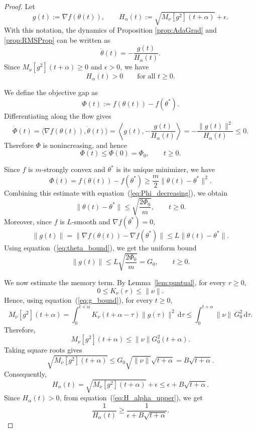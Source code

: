 \documentclass{article} %
\begin{document}
\begin{proof}
Let
\[
g(t):=\nabla f(\theta(t)),
\qquad
H_\alpha(t)
:=
\sqrt{M_\nu[g^2](t+\alpha)}+\epsilon.
\]
With this notation, the dynamics of Proposition \ref{prop:AdaGrad} and \ref{prop:RMSProp} can be written as
\[
\dot\theta(t)
=
-
\frac{g(t)}{H_\alpha(t)}.
\]
Since \(M_\nu[g^2](t+\alpha)\ge 0\) and \(\epsilon>0\), we have
\[
H_\alpha(t)>0
\qquad \text{for all } t\ge 0.
\]

We define the objective gap as
\[
\Phi(t)
:=
f(\theta(t))-f(\theta^*).
\]
Differentiating along the flow gives
\[
\dot\Phi(t)
=
\langle \nabla f(\theta(t)),\dot\theta(t)\rangle
=
\left\langle g(t),-\frac{g(t)}{H_\alpha(t)}\right\rangle
=
-
\frac{\|g(t)\|^2}{H_\alpha(t)}
\le 0.
\]
Therefore \(\Phi\) is nonincreasing, and hence
\begin{equation}
\label{eq:Phi_decreasing}
\Phi(t)\le \Phi(0)=\Phi_0,
\qquad t\ge 0.
\end{equation}

Since \(f\) is \(m\)-strongly convex and \(\theta^*\) is its unique minimizer, we have
\[
\Phi(t)
=
f(\theta(t))-f(\theta^*)
\ge
\frac m2\|\theta(t)-\theta^*\|^2.
\]
Combining this estimate with equation~(\ref{eq:Phi_decreasing}), we obtain
\begin{equation}
\label{eq:theta_bound}
\|\theta(t)-\theta^*\|
\le
\sqrt{\frac{2\Phi_0}{m}},
\qquad t\ge 0.
\end{equation}
Moreover, since \(f\) is \(L\)-smooth and \(\nabla f(\theta^*)=0\),
\[
\|g(t)\|
=
\|\nabla f(\theta(t))-\nabla f(\theta^*)\|
\le
L\|\theta(t)-\theta^*\|.
\]
Using equation~(\ref{eq:theta_bound}), we get the uniform bound
\begin{equation}
\label{eq:g_bound}
\|g(t)\|
\le
L\sqrt{\frac{2\Phi_0}{m}}
=
G_0,
\qquad t\ge 0.
\end{equation}

We now estimate the memory term. By Lemma~\ref{lem:puntual}, for every \(r\ge 0\),
\[
0\le K_\nu(r)\le \|\nu\|.
\]
Hence, using equation~(\ref{eq:g_bound}), for every \(t\ge 0\),
\[
M_\nu[g^2](t+\alpha)
=
\int_0^{t+\alpha}
K_\nu(t+\alpha-\tau)\|g(\tau)\|^2\,\mathrm d\tau
\le
\int_0^{t+\alpha}
\|\nu\|\,G_0^2\,\mathrm d\tau.
\]
Therefore,
\begin{equation}
\label{eq:memory_bound}
M_\nu[g^2](t+\alpha)
\le
\|\nu\|G_0^2(t+\alpha).
\end{equation}
Taking square roots gives
\[
\sqrt{M_\nu[g^2](t+\alpha)}
\le
G_0\sqrt{\|\nu\|}\sqrt{t+\alpha}
=
B\sqrt{t+\alpha}.
\]
Consequently,
\begin{equation}
\label{eq:H_alpha_upper}
H_\alpha(t)
=
\sqrt{M_\nu[g^2](t+\alpha)}+\epsilon
\le
\epsilon+B\sqrt{t+\alpha}.
\end{equation}
Since \(H_\alpha(t)>0\), from equation~(\ref{eq:H_alpha_upper}), we get
\begin{equation}
\label{eq:mu_lower_corrected}
\frac1{H_\alpha(t)}
\ge
\frac1{\epsilon+B\sqrt{t+\alpha}}.
\end{equation}


\end{proof}
\end{document}
